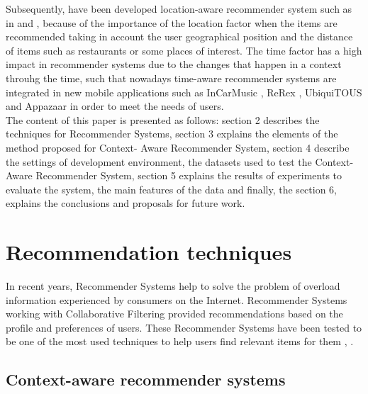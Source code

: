 Subsequently, have been developed location-aware recommender system such as in
\cite{levandoski2012lars} and \cite{kaminskas2011location}, because of the
importance of the location factor when the items are recommended taking in
account the user geographical position and the distance of items such as
restaurants or some places of interest. The time factor has a high impact in
recommender systems due to the changes that happen in a context throuhg the
time, such that nowadays time-aware recommender systems \cite{hamed2012t} are
integrated in new mobile applications such as InCarMusic
\cite{baltrunas2011incarmusic},  ReRex \cite{baltrunas2011mobile},  UbiquiTOUS
\cite{bellavista2012survey} and Appazaar \cite{bohmer2010contextualizing} in
order to meet the needs of users. \\
The content of this paper is presented as
follows: section 2 describes the techniques for Recommender Systems, section 3
explains the elements of the method proposed for Context- Aware Recommender
System, section 4 describe the settings of development environment, the datasets
used to test the Context-Aware Recommender System, section 5 explains the
results of experiments to evaluate the system, the main features of the data and
finally, the section 6, explains the conclusions and proposals for future work.

\section{ Recommendation techniques } \label{sec:2} 

In recent years, Recommender Systems help to solve the problem of overload
information experienced by consumers on the Internet. Recommender Systems
working with Collaborative Filtering provided recommendations based on the
profile and preferences of users. These Recommender Systems have been tested to
be one of the most used techniques to help users find relevant items for them
\cite{dey2001understanding}, \cite{burke2007hybrid}.

  \subsection{Context-aware recommender systems} \label{sec:2.1}  

